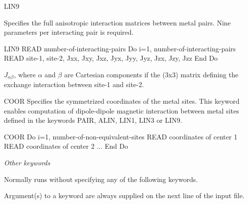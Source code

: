 \begin{keywordlist}
\item[LIN9]

Specifies the full anisotropic interaction matrices between metal pairs. Nine parameters per interacting pair is required.

\begin{sourcelisting}
LIN9
   READ number-of-interacting-pairs
   Do i=1, number-of-interacting-pairs
      READ site-1, site-2,   Jxx, Jxy, Jxz,   Jyx, Jyy, Jyz,  Jzx, Jzy, Jzz
   End Do
\end{sourcelisting}
$J_{\alpha\beta}$, where $\alpha$ and $\beta$ are Cartesian components if the (3x3) matrix defining the exchange interaction between site-1 and site-2.


\item[COOR]
Specifies the symmetrized coordinates of the metal sites. This keyword enables computation of dipole-dipole
magnetic interaction between metal sites defined in the keywords PAIR, ALIN, LIN1, LIN3 or LIN9.

\begin{sourcelisting}
COOR
   Do i=1, number-of-non-equivalent-sites
      READ coordinates of center 1
      READ coordinates of center 2
      ...
   End Do
\end{sourcelisting}


\end{keywordlist}





\textit{Other keywords}


Normally  runs without specifying any of the following keywords.



Argument(s) to a keyword are always supplied on the next line of the input file.
%
